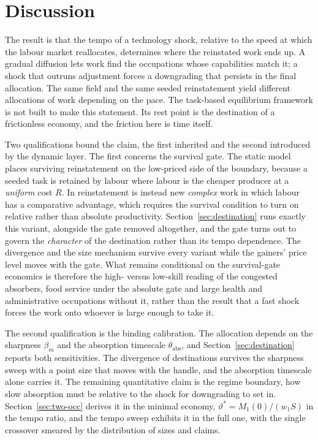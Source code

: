 \documentclass[12pt, a4paper]{article}
\begin{document}
\section{Discussion}
\label{sec:discussion}

The result is that the tempo of a technology shock, relative to the
speed at which the labour market reallocates, determines where the
reinstated work ends up. A gradual diffusion lets work find the
occupations whose capabilities match it; a shock that outruns adjustment
forces a downgrading that persists in the final allocation. The same
field and the same seeded reinstatement yield different allocations of
work depending on the pace. The task-based equilibrium framework is not
built to make this statement. Its rest point is the destination of a
frictionless economy, and the friction here is time itself.

Two qualifications bound the claim, the first inherited and the second
introduced by the dynamic layer. The first concerns the survival gate. The static model
places surviving reinstatement on the low-priced side of the boundary,
because a seeded task is retained by labour where labour is the
cheaper producer at a \emph{uniform} cost $R$. In
\textcite{acemoglu2019automation} reinstatement is instead new
\emph{complex} work in which labour has a comparative advantage, which
requires the survival condition to turn on relative rather than
absolute productivity. Section~\ref{sec:destination} runs exactly this variant,
alongside the gate removed altogether, and the gate turns out to
govern the \emph{character} of the destination rather than its tempo
dependence. The divergence and the size mechanism survive every variant
while the gainers' price level moves with the gate. What remains
conditional on the survival-gate economics is therefore the high-
versus low-skill reading of the congested absorbers, food service under
the absolute gate and large health and administrative occupations
without it, rather than the result that a fast shock forces the work
onto whoever is large enough to take it.

The second qualification is the binding calibration. The allocation
depends on the sharpness $\beta_m$ and the absorption timescale
$\theta_{\text{abs}}$, and Section~\ref{sec:destination} reports both
sensitivities. The divergence of destinations survives the sharpness
sweep with a point size that moves with the handle, and the absorption
timescale alone carries it. The remaining quantitative claim is the
regime boundary, how slow absorption must be relative to the shock for
downgrading to set in. Section~\ref{sec:two-occ} derives it in the
minimal economy, $\vartheta^* = M_1(0)/(w_1 S)$ in the tempo ratio, and the
tempo sweep exhibits it in the full one, with the single crossover
smeared by the distribution of sizes and claims.
\end{document}
